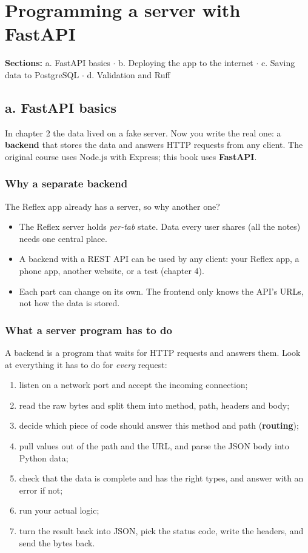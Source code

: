 \chapter{Programming a server with FastAPI}

\textbf{Sections:} a. FastAPI basics $\cdot$ b. Deploying the app to the internet $\cdot$ c. Saving data to PostgreSQL $\cdot$ d. Validation and Ruff

\section{a. FastAPI basics}

In chapter 2 the data lived on a fake server. Now you write the real one: a \textbf{backend} that stores the data and answers HTTP requests from any client. The original course uses Node.js with Express; this book uses \textbf{FastAPI}.

\subsection{Why a separate backend}

The Reflex app already has a server, so why another one?
\begin{itemize}
\item The Reflex server holds \emph{per-tab} state. Data every user shares (all the notes) needs one central place.
\item A backend with a REST API can be used by any client: your Reflex app, a phone app, another website, or a test (chapter 4).
\item Each part can change on its own. The frontend only knows the API's URLs, not how the data is stored.
\end{itemize}

\subsection{What a server program has to do}

A backend is a program that waits for HTTP requests and answers them. Look at everything it has to do for \emph{every} request:

\begin{enumerate}
\item listen on a network port and accept the incoming connection;
\item read the raw bytes and split them into method, path, headers and body;
\item decide which piece of code should answer this method and path (\textbf{routing});
\item pull values out of the path and the URL, and parse the JSON body into Python data;
\item check that the data is complete and has the right types, and answer with an error if not;
\item run your actual logic;
\item turn the result back into JSON, pick the status code, write the headers, and send the bytes back.
\end{enumerate}

